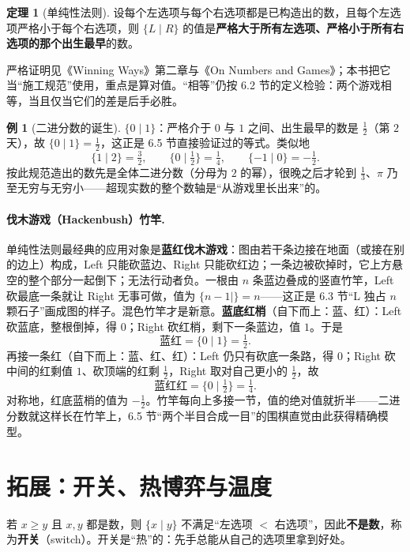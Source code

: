 \documentclass[UTF8,a4paper,11pt,oneside,openany,fontset=fandol]{ctexbook}
\theoremstyle{definition}
\newtheorem{theorem}[definition]{定理}
\newtheorem{example}[definition]{例}
\begin{document}
\begin{theorem}[单纯性法则]\label{thm:simplicity}
设每个左选项与每个右选项都是已构造出的数，且每个左选项严格小于每个右选项，则 $\{L\mid R\}$ 的值是\textbf{严格大于所有左选项、严格小于所有右选项的那个出生最早}的数。
\end{theorem}

严格证明见《Winning Ways》第二章与《On Numbers and Games》；本书把它当“施工规范”使用，重点是算对值。“相等”仍按 6.2 节的定义检验：两个游戏相等，当且仅当它们的差是后手必胜。

\begin{example}[二进分数的诞生]\label{ex:dyadic}
$\{0\mid 1\}$：严格介于 $0$ 与 $1$ 之间、出生最早的数是 $\tfrac12$（第 $2$ 天），故 $\{0\mid 1\}=\tfrac12$，这正是 6.5 节直接验证过的等式。类似地
\[
 \{1\mid 2\}=\tfrac32,\qquad \{0\mid \tfrac12\}=\tfrac14,\qquad \{-1\mid 0\}=-\tfrac12 .
\]
按此规范造出的数先是全体二进分数（分母为 $2$ 的幂），很晚之后才轮到 $\tfrac13$、$\pi$ 乃至无穷与无穷小——超现实数的整个数轴是“从游戏里长出来”的。
\end{example}

\paragraph{伐木游戏（Hackenbush）竹竿.} 单纯性法则最经典的应用对象是\textbf{蓝红伐木游戏}：图由若干条边接在地面（或接在别的边上）构成，Left 只能砍蓝边、Right 只能砍红边；一条边被砍掉时，它上方悬空的整个部分一起倒下；无法行动者负。一根由 $n$ 条蓝边叠成的竖直竹竿，Left 砍最底一条就让 Right 无事可做，值为 $\{n-1\mid\}=n$——这正是 6.3 节“L 独占 $n$ 颗石子”画成图的样子。混色竹竿才是新意。\textbf{蓝底红梢}（自下而上：蓝、红）：Left 砍蓝底，整根倒掉，得 $0$；Right 砍红梢，剩下一条蓝边，值 $1$。于是
\[
 \text{蓝红}=\{0\mid 1\}=\tfrac12 .
\]
再接一条红（自下而上：蓝、红、红）：Left 仍只有砍底一条路，得 $0$；Right 砍中间的红剩值 $1$、砍顶端的红剩 $\tfrac12$，Right 取对自己更小的 $\tfrac12$，故
\[
 \text{蓝红红}=\{0\mid \tfrac12\}=\tfrac14 .
\]
对称地，红底蓝梢的值为 $-\tfrac12$。竹竿每向上多接一节，值的绝对值就折半——二进分数就这样长在竹竿上，6.5 节“两个半目合成一目”的围棋直觉由此获得精确模型。

\section{拓展：开关、热博弈与温度}
若 $x\ge y$ 且 $x,y$ 都是数，则 $\{x\mid y\}$ 不满足“左选项 $<$ 右选项”，因此\textbf{不是数}，称为\textbf{开关}（switch）。开关是“热”的：先手总能从自己的选项里拿到好处。
\end{document}
